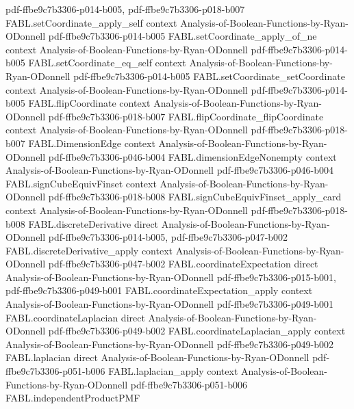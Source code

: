 \begin{theorem}
  {pdf-ffbe9c7b3306-p014-b005,
    pdf-ffbe9c7b3306-p018-b007}
\proofstep
  {FABL.setCoordinate_apply_self}
  {context}
  {Analysis-of-Boolean-Functions-by-Ryan-ODonnell}
  {pdf-ffbe9c7b3306-p014-b005}
\proofstep
  {FABL.setCoordinate_apply_of_ne}
  {context}
  {Analysis-of-Boolean-Functions-by-Ryan-ODonnell}
  {pdf-ffbe9c7b3306-p014-b005}
\proofstep
  {FABL.setCoordinate_eq_self}
  {context}
  {Analysis-of-Boolean-Functions-by-Ryan-ODonnell}
  {pdf-ffbe9c7b3306-p014-b005}
\proofstep
  {FABL.setCoordinate_setCoordinate}
  {context}
  {Analysis-of-Boolean-Functions-by-Ryan-ODonnell}
  {pdf-ffbe9c7b3306-p014-b005}
\proofstep
  {FABL.flipCoordinate}
  {context}
  {Analysis-of-Boolean-Functions-by-Ryan-ODonnell}
  {pdf-ffbe9c7b3306-p018-b007}
\proofstep
  {FABL.flipCoordinate_flipCoordinate}
  {context}
  {Analysis-of-Boolean-Functions-by-Ryan-ODonnell}
  {pdf-ffbe9c7b3306-p018-b007}
\proofstep
  {FABL.DimensionEdge}
  {context}
  {Analysis-of-Boolean-Functions-by-Ryan-ODonnell}
  {pdf-ffbe9c7b3306-p046-b004}
\proofstep
  {FABL.dimensionEdgeNonempty}
  {context}
  {Analysis-of-Boolean-Functions-by-Ryan-ODonnell}
  {pdf-ffbe9c7b3306-p046-b004}
\proofstep
  {FABL.signCubeEquivFinset}
  {context}
  {Analysis-of-Boolean-Functions-by-Ryan-ODonnell}
  {pdf-ffbe9c7b3306-p018-b008}
\proofstep
  {FABL.signCubeEquivFinset_apply_card}
  {context}
  {Analysis-of-Boolean-Functions-by-Ryan-ODonnell}
  {pdf-ffbe9c7b3306-p018-b008}
\proofstep
  {FABL.discreteDerivative}
  {direct}
  {Analysis-of-Boolean-Functions-by-Ryan-ODonnell}
  {pdf-ffbe9c7b3306-p014-b005,
    pdf-ffbe9c7b3306-p047-b002}
\proofstep
  {FABL.discreteDerivative_apply}
  {context}
  {Analysis-of-Boolean-Functions-by-Ryan-ODonnell}
  {pdf-ffbe9c7b3306-p047-b002}
\proofstep
  {FABL.coordinateExpectation}
  {direct}
  {Analysis-of-Boolean-Functions-by-Ryan-ODonnell}
  {pdf-ffbe9c7b3306-p015-b001,
    pdf-ffbe9c7b3306-p049-b001}
\proofstep
  {FABL.coordinateExpectation_apply}
  {context}
  {Analysis-of-Boolean-Functions-by-Ryan-ODonnell}
  {pdf-ffbe9c7b3306-p049-b001}
\proofstep
  {FABL.coordinateLaplacian}
  {direct}
  {Analysis-of-Boolean-Functions-by-Ryan-ODonnell}
  {pdf-ffbe9c7b3306-p049-b002}
\proofstep
  {FABL.coordinateLaplacian_apply}
  {context}
  {Analysis-of-Boolean-Functions-by-Ryan-ODonnell}
  {pdf-ffbe9c7b3306-p049-b002}
\proofstep
  {FABL.laplacian}
  {direct}
  {Analysis-of-Boolean-Functions-by-Ryan-ODonnell}
  {pdf-ffbe9c7b3306-p051-b006}
\proofstep
  {FABL.laplacian_apply}
  {context}
  {Analysis-of-Boolean-Functions-by-Ryan-ODonnell}
  {pdf-ffbe9c7b3306-p051-b006}
\proofstep
  {FABL.independentProductPMF}

\end{theorem}
